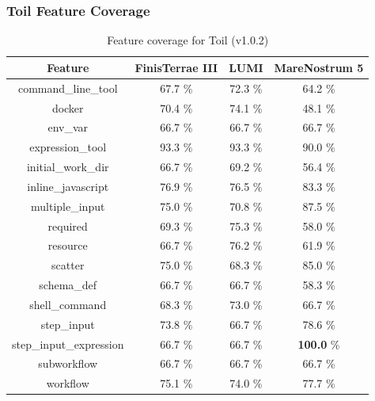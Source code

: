 \documentclass{article}
\begin{document}
\subsubsection*{Toil Feature Coverage}
\begin{table}[ht!]
\centering
\setlength{\tabcolsep}{6pt}
\renewcommand{\arraystretch}{1.2}
\begin{tabular}{|c|c|c|c|}
\hline
\rowcolor{lightgray!50}
\textbf{Feature} & \textbf{FinisTerrae III} & \textbf{LUMI} & \textbf{MareNostrum 5} \\
\hline
command\_line\_tool & 67.7 \% & 72.3 \% & 64.2 \% \\
docker & 70.4 \% & 74.1 \% & 48.1 \% \\
env\_var & 66.7 \% & 66.7 \% & 66.7 \% \\
expression\_tool & 93.3 \% & 93.3 \% & 90.0 \% \\
initial\_work\_dir & 66.7 \% & 69.2 \% & 56.4 \% \\
inline\_javascript & 76.9 \% & 76.5 \% & 83.3 \% \\
multiple\_input & 75.0 \% & 70.8 \% & 87.5 \% \\
required & 69.3 \% & 75.3 \% & 58.0 \% \\
resource & 66.7 \% & 76.2 \% & 61.9 \% \\
scatter & 75.0 \% & 68.3 \% & 85.0 \% \\
schema\_def & 66.7 \% & 66.7 \% & 58.3 \% \\
shell\_command & 68.3 \% & 73.0 \% & 66.7 \% \\
step\_input & 73.8 \% & 66.7 \% & 78.6 \% \\
step\_input\_expression & 66.7 \% & 66.7 \% & \textbf{100.0} \% \\
subworkflow & 66.7 \% & 66.7 \% & 66.7 \% \\
workflow & 75.1 \% & 74.0 \% & 77.7 \% \\
\hline
\end{tabular}
\caption{Feature coverage for Toil (v1.0.2)}
\label{tab:toil_feat_v10}
\end{table}
\end{document}

